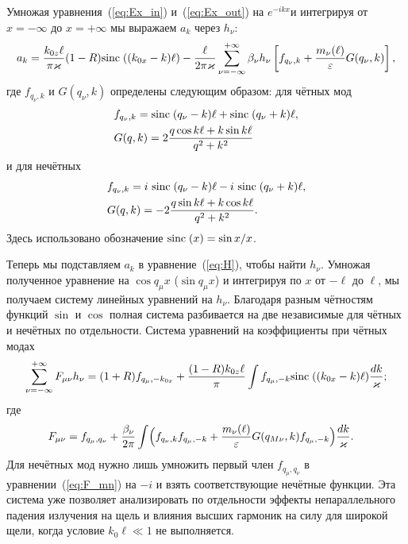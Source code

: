 Умножая уравнения~(\ref{eq:Ex_in}) и~(\ref{eq:Ex_out}) на $e^{-ikx}$и интегрируя от $x = -\infty$ до $x = +\infty$  
мы выражаем $a_k$ через $h_\nu$:
\begin{align}
a_k = \frac{k_{0z}\ell }{\pi \varkappa} (1-R)\mathrm{sinc}\;((k_{0x}-k)\ell) 
        - \frac{\ell}{2 \pi \varkappa}\sum_{\nu = -\infty}^{+\infty} \beta_\nu h_\nu\left[f_{q_\nu,k}
+ \frac{m_\nu(\ell)}{\varepsilon}G(q_\nu,k)\right],
\end{align}
где $f_{q_\nu,k}$ и $G(q_\nu,k)$ определены следующим образом:  для чётных мод
\begin{align*}
&f_{q_\nu,k} =
\mathrm{sinc}\;(q_\nu-k)\ell + \mathrm{sinc}\;(q_\nu+k)\ell,\\
&G(q,k) = 2\frac{q\cos{k\ell}+k\sin{k\ell}}{q^2 + k^2}\\
\end{align*}
и для нечётных
\begin{align}
&f_{q_\nu,k} = i\ \sinc(q_\nu-k)\ell - i\ \sinc(q_\nu+k)\ell,\nonumber\\
& G(q,k) = -2\frac{q\sin{k\ell}+k\cos{k\ell}}{q^2 + k^2}.
\end{align}
Здесь использовано обозначение  $\mathrm{sinc}\;(x) = {\sin{x}}/{x}$.

Теперь мы подставляем $a_k$ в уравнение~(\ref{eq:H}), чтобы найти $h_\nu$. Умножая полученное уравнение на  $\cos{q_\mu x}$ ($\sin{q_\mu x}$) 
и интегрируя по $x$ от $-\ell$ до $\ell$, мы получаем систему линейных уравнений на $h_\nu$. Благодаря разным чётностям функций $\sin$ и $\cos$  полная система
разбивается на две независимые для чётных и нечётных по отдельности. Система уравнений на коэффициенты при чётных модах 
\begin{align}
	\sum_{\nu=-\infty}^{+\infty} F_{\mu \nu} h_\nu = (1+R)f_{q_\mu,-k_{0x}} + \frac{(1-R)k_{0z} \ell}{\pi}\int f_{q_\mu,-k}\mathrm{sinc}\;((k_{0x}-k)\ell) \frac{dk}{\varkappa}; \label{eq:General_System}
\end{align}
где 
\begin{align}
F_{\mu \nu} &= f_{q_\mu,q_\nu} + \frac{\beta_\nu}{2\pi}\int
\Bigl(f_{q_\nu,k}f_{q_\mu,-k}  + \frac{m_\nu(\ell)}{\varepsilon} G(q_{M\nu},k)f_{q_\mu,-k} \Bigr)\frac{dk}{\varkappa}.
\label{eq:F_mn}
\end{align}
Для нечётных мод нужно лишь умножить первый член $f_{q_\mu,q_\nu}$ в уравнении~(\ref{eq:F_mn}) на $-i$ и взять соответствующие нечётные функции. Эта система уже позволяет анализировать по отдельности эффекты непараллельного падения излучения на щель и влияния высших гармоник на силу
для широкой щели, когда условие $k_0 \ell \ll 1$ не выполняется.

